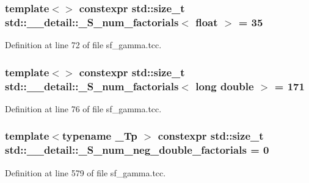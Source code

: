 \subsubsection[{\+\_\+\+S\+\_\+num\+\_\+factorials$<$ float $>$}]{\setlength{\rightskip}{0pt plus 5cm}template$<$$>$ constexpr std\+::size\+\_\+t {\bf std\+::\+\_\+\+\_\+detail\+::\+\_\+\+S\+\_\+num\+\_\+factorials}$<$ float $>$ = 35}\label{namespacestd_1_1____detail_a3a29651303ca2222246ef6f0a17e92ec}


Definition at line 72 of file sf\+\_\+gamma.\+tcc.

\hypertarget{namespacestd_1_1____detail_ab90b8eb39ff963a5ed533a3be0b7f7fd}{}
\subsubsection[{\+\_\+\+S\+\_\+num\+\_\+factorials$<$ long double $>$}]{\setlength{\rightskip}{0pt plus 5cm}template$<$$>$ constexpr std\+::size\+\_\+t {\bf std\+::\+\_\+\+\_\+detail\+::\+\_\+\+S\+\_\+num\+\_\+factorials}$<$ long double $>$ = 171}\label{namespacestd_1_1____detail_ab90b8eb39ff963a5ed533a3be0b7f7fd}


Definition at line 76 of file sf\+\_\+gamma.\+tcc.

\hypertarget{namespacestd_1_1____detail_ac386f200e589ce1fc895c2aac0e47f8c}{}
\subsubsection[{\+\_\+\+S\+\_\+num\+\_\+neg\+\_\+double\+\_\+factorials}]{\setlength{\rightskip}{0pt plus 5cm}template$<$typename \+\_\+\+Tp $>$ constexpr std\+::size\+\_\+t std\+::\+\_\+\+\_\+detail\+::\+\_\+\+S\+\_\+num\+\_\+neg\+\_\+double\+\_\+factorials = 0}\label{namespacestd_1_1____detail_ac386f200e589ce1fc895c2aac0e47f8c}


Definition at line 579 of file sf\+\_\+gamma.\+tcc.

